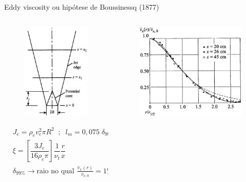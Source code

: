\documentclass[10pt]{beamer}
\newcommand{\m}[1]{\overline{#1}}
\begin{document}
\begin{frame}{Eddy viscosity ou hipótese de Boussinessq (1877)}
	\begin{columns}
		\begin{column}{0.5\textwidth}
			\begin{figure}
				\centering
				\includegraphics[width=0.6\linewidth]{jet}
				\label{fig:jet}
			\end{figure}
			\begin{align*}
			&J_e = \rho_e v_e^2 \pi R^2 \;\;;\;\; l_m = 0,075 \; \delta_{99\%} \\
			&\xi = \left[ \dfrac{3 J_e}{16 \rho_e \pi} \right] \dfrac{1}{\nu_t}\dfrac{r}{x} \\
			&\delta_{99\%} \rightarrow \text{raio no qual } \frac{\m{v}_x(r)}{\m{v}_{x,0}} = 1\%
			\end{align*}
		\end{column}
		\begin{column}{0.5\textwidth}
			\begin{figure}
				\centering
				\includegraphics[width=0.9\linewidth]{jetVel}

\end{figure}
\end{column}
\end{columns}
\end{frame}
\end{document}
